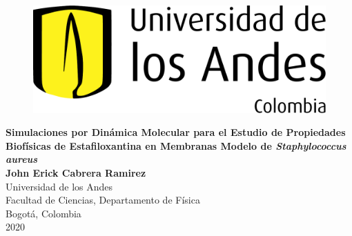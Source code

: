 \begin{center}
\begin{figure}
\centering%
\includegraphics[scale=0.2]{./HojaTitulo/University_of_Los_Andes_logo.pdf}
\end{figure}
\thispagestyle{empty} \vspace*{1.5cm} \textbf{\huge
Simulaciones por Din\'{a}mica Molecular para el Estudio de Propiedades Biof\'{i}sicas de Estafiloxantina en Membranas Modelo de \textit{Staphylococcus aureus}}\\[5.0cm]
\Large\textbf{John Erick Cabrera Ramirez}\\[6.0cm]
\small Universidad de los Andes\\
Facultad de Ciencias, Departamento de F\'{i}sica\\
Bogot\'{a}, Colombia\\
2020\\
\end{center}

\newpage{\pagestyle{empty}\cleardoublepage}

